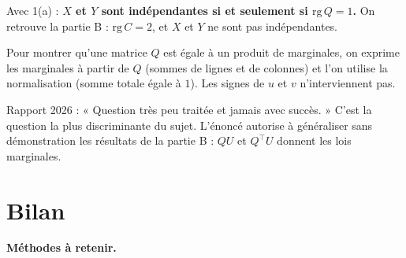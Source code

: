 \documentclass[11pt,a4paper]{article}
\begin{document}
Avec 1(a) : \textbf{\(X\) et \(Y\) sont indépendantes si et seulement si \(\mathrm{rg}\,Q=1\).} On retrouve la partie B : \(\mathrm{rg}\,C=2\), et \(X\) et \(Y\) ne sont pas indépendantes.

\begin{methode}

Pour montrer qu'une matrice \(Q\) est égale à un produit de marginales, on exprime les marginales à partir de \(Q\) (sommes de lignes et de colonnes) et l'on utilise la normalisation (somme totale égale à \(1\)). Les signes de \(u\) et \(v\) n'interviennent pas.

\end{methode}

\begin{jury}

Rapport 2026 : « Question très peu traitée et jamais avec succès. » C'est la question la plus discriminante du sujet. L'énoncé autorise à généraliser sans démonstration les résultats de la partie B : \(QU\) et \(Q^\top U\) donnent les lois marginales.

\end{jury}

\hypertarget{bilan}{%
\section{Bilan}\label{bilan}}

\textbf{Méthodes à retenir.}
\end{document}
